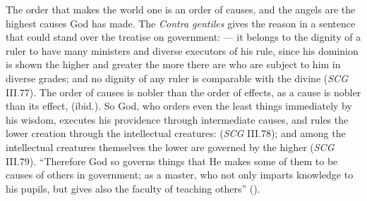 The order that makes the world one is an order of causes, and the angels
are the highest causes God has made. The \emph{Contra gentiles} gives the
reason in a sentence that could stand over the treatise on government:
 --- it
belongs to the dignity of a ruler to have many ministers and diverse
executors of his rule, since his dominion is shown the higher and greater the
more there are who are subject to him in diverse grades; and no dignity of any
ruler is comparable with the divine (\emph{SCG} III.77). The order of
causes is nobler than the order of effects, as a cause is nobler than its
effect, 
(ibid.). So God, who orders even the least things immediately by his wisdom,
executes his providence through intermediate causes, and rules the lower
creation through the intellectual creatures:  (\emph{SCG} III.78); and among the
intellectual creatures themselves the lower are governed by the higher
(\emph{SCG} III.79). ``Therefore God so governs things that He makes some of
them to be causes of others in government; as a master, who not only imparts
knowledge to his pupils, but gives also the faculty of teaching others''
().

